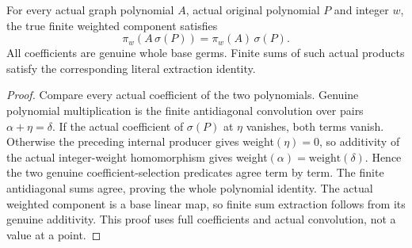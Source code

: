 \begin{lemma}
\label{hir:relative-normal-graph-weight-product-extraction}
\leanok
For every actual graph polynomial $A$, actual original polynomial $P$ and integer $w$, the true finite weighted component satisfies
\[\pi_w(A\,\sigma(P))=\pi_w(A)\,\sigma(P).\]
All coefficients are genuine whole base germs. Finite sums of such actual products satisfy the corresponding literal extraction identity.
\end{lemma}
\begin{proof}
Compare every actual coefficient of the two polynomials. Genuine polynomial multiplication is the finite antidiagonal convolution over pairs $\alpha+\eta=\delta$. If the actual coefficient of $\sigma(P)$ at $\eta$ vanishes, both terms vanish. Otherwise the preceding internal producer gives weight$(\eta)=0$, so additivity of the actual integer-weight homomorphism gives weight$(\alpha)=\text{weight}(\delta)$. Hence the two genuine coefficient-selection predicates agree term by term. The finite antidiagonal sums agree, proving the whole polynomial identity. The actual weighted component is a base linear map, so finite sum extraction follows from its genuine additivity. This proof uses full coefficients and actual convolution, not a value at a point.
\end{proof}

